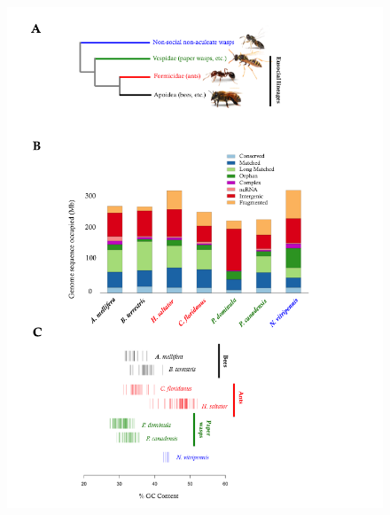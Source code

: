 \begin{figure}[h]
\centering
\includegraphics[width=6in]{Assets/Graphics/Pdom/figure-1}
\caption{~}
\label{Fig:Pdom1}
\end{figure}


